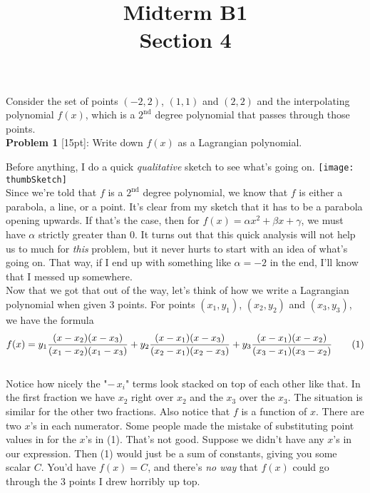 \documentclass{article}
\newcommand\numberthis{\addtocounter{equation}{1}\tag{\theequation}}
\def\a{\alpha}
\def\b{\beta}
\def\c{\gamma}
\begin{document}
 
 
 
\title{
    \textmd{\Huge{Midterm B1}}\\
    \textmd{\huge{Section 4}}
}


\maketitle

Consider the set of points $(-2, 2)$, $(1, 1)$ and $(2, 2)$ and the interpolating polynomial $f(x)$, which is a $2^\text{nd}$ degree polynomial that passes through those points. \\

\textbf{Problem 1} [15pt]: Write down $f(x)$ as a Lagrangian polynomial.

Before anything, I do a quick \textit{qualitative} sketch to see what's going on. \hspace*{3cm}\texttt{[image: thumbSketch]}\\

Since we're told that $f$ is a $2^\text{nd}$ degree polynomial, we know that $f$ is either a parabola, a line, or a point. It's clear from my sketch that it has to be a parabola opening upwards. If that's the case, then for $f(x) = \a x^2 + \b x + \c$, we must have $\a$ strictly greater than $0$. It turns out that this quick analysis will not help us to much for \textit{this} problem, but it never hurts to start with an idea of what's going on. That way, if I end up with something like $\a = -2$ in the end, I'll know that I messed up somewhere. \\

Now that we got that out of the way, let's think of how we write a Lagrangian polynomial when given 3 points. For points $(x_1, y_1)$, $(x_2, y_2)$ and $(x_3, y_3)$, we have the formula \\

\[
f(x)  = y_1 \frac{(x - x_2)(x - x_3)}{(x_1 - x_2)(x_1 - x_3)} + y_2 \frac{(x - x_1)(x - x_3)}{(x_2 - x_1)(x_2 - x_3)} + y_3 \frac{(x - x_1)(x - x_2)}{(x_3 - x_1)(x_3 - x_2)} \numberthis
\] \\

Notice how nicely the "$ - \, x_i $" terms look stacked on top of each other like that. In the first fraction we have $x_2$ right over $x_2$ and the $x_3$ over the $x_3$. The situation is similar for the other two fractions. Also notice that $f$ is a function of $x$. There are two $x$'s in each numerator. Some people made the mistake of substituting point values in for the $x$'s in (1). That's not good. Suppose we didn't have any $x$'s in our expression. Then (1) would just be a sum of constants, giving you some scalar $C$.  You'd have $f(x) = C$, and there's \textit{no way} that $f(x)$ could go through the 3 points I drew horribly up top. \\
\end{document}
